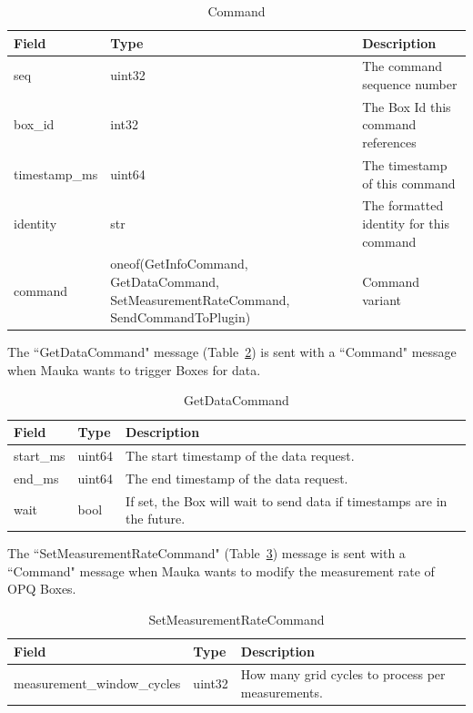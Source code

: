 \begin{table}[H]
	\centering
	\caption{Command}
	\begin{tabularx}{\textwidth}{lXX}
		\toprule
		\textbf{Field} & \textbf{Type} & \textbf{Description} \\
		\midrule
		seq & uint32 & The command sequence number \\
		box\_id & int32 & The Box Id this command references \\
		timestamp\_ms & uint64 & The timestamp of this command \\
		identity & str & The formatted identity for this command \\
		command & oneof(GetInfoCommand, GetDataCommand, SetMeasurementRateCommand, SendCommandToPlugin) & Command variant \\
		\bottomrule
	\end{tabularx}
	\label{table:Command}
\end{table}

The ``GetDataCommand" message (Table~\ref{table:GetDataCommand}) is sent with a ``Command" message when Mauka wants to trigger Boxes for data.

\begin{table}[H]
    \centering
    \caption{GetDataCommand}
    \begin{tabularx}{\textwidth}{llX}
        \toprule
        \textbf{Field} & \textbf{Type} & \textbf{Description} \\
        \midrule
        start\_ms & uint64 & The start timestamp of the data request. \\
        end\_ms & uint64 & The end timestamp of the data request. \\
        wait & bool & If set, the Box will wait to send data if timestamps are in the future. \\
        \bottomrule
    \end{tabularx}
    \label{table:GetDataCommand}
\end{table}

The ``SetMeasurementRateCommand" (Table~\ref{table:SetMeasurementRateCommand}) message is sent with a ``Command" message when Mauka wants to modify the measurement rate of OPQ Boxes.

\begin{table}[H]
	\centering
	\caption{SetMeasurementRateCommand}
	\begin{tabularx}{\textwidth}{llX}
		\toprule
		\textbf{Field} & \textbf{Type} & \textbf{Description} \\
		\midrule
		measurement\_window\_cycles & uint32 & How many grid cycles to process per measurements. \\
		\bottomrule
	\end{tabularx}
	\label{table:SetMeasurementRateCommand}
\end{table}

